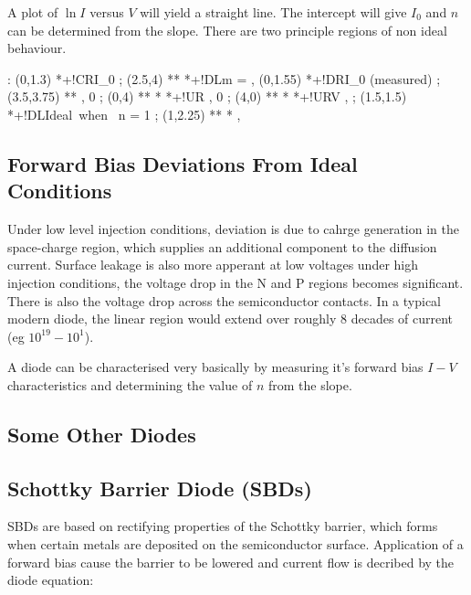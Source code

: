 \documentclass[a4paper,12pt]{article}
\begin{document}
A plot of $\ln{I}$ versus $V$ will yield a straight line. The
intercept will give $I_{0}$ and $n$ can be determined from the slope.
There are two principle regions of non ideal behaviour.

\begin{table}[hbtp]

\xy <1cm,0cm>:
(0,1.3) *+!CR{I_{0}} ; (2.5,4) **\dir{--} *+!DL{m = } ,
(0,1.55) *+!DR{I_{0} (measured)} ; (3.5,3.75)
** ,
0 ; (0,4) **\dir{-} *\dir{>} *+!UR{} ,
0 ; (4,0) **\dir{-} *\dir{>} *+!UR{V} ,
; (1.5,1.5) *+!DL{\mbox{Ideal when } n = 1} ; (1,2.25) **\dir{-} *\dir{>} ,
\endxy

\end{table}

\subsection{Forward Bias Deviations From Ideal Conditions}

Under low level injection conditions, deviation is due to cahrge
generation in the space-charge region, which supplies an additional
component to the diffusion current. Surface leakage is also more
apperant at low voltages under high injection conditions, the voltage
drop in the N and P regions becomes significant. There is also the
voltage drop across the semiconductor contacts. In a typical modern
diode, the linear region would extend over roughly $8$ decades of
current (eg $10^{19} - 10^{1}$).

A diode can be characterised very basically by measuring it's
forward bias $I - V$ characteristics and determining the value of $n$
from the slope.


\subsection{Some Other Diodes}

\subsection{Schottky Barrier Diode (SBDs)}

SBDs are based on rectifying properties of the Schottky barrier, which
forms when certain metals are deposited on the semiconductor surface.
Application of a forward bias cause the barrier to be lowered and
current flow is decribed by the diode equation:
\end{document}
